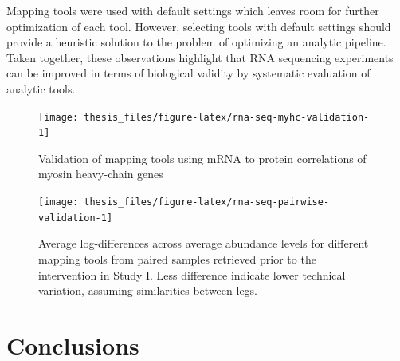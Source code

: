 \documentclass[twoside,10pt]{gihclass} %
\begin{document}
Mapping tools were used with default settings which leaves room for further optimization of each tool. However, selecting tools with default settings should provide a heuristic solution to the problem of optimizing an analytic pipeline. Taken together, these observations highlight that RNA sequencing experiments can be improved in terms of biological validity by systematic evaluation of analytic tools.
\begin{figure}

{\centering \texttt{[image: thesis\_files/figure-latex/rna-seq-myhc-validation-1]} 

}

\caption[Correlations between gene-family normalized protein and gene data from different mRNA quantification methods.]{Validation of mapping tools using mRNA to protein correlations of myosin heavy-chain genes}\label{fig:rna-seq-myhc-validation}
\end{figure}
\begin{figure}

{\centering \texttt{[image: thesis\_files/figure-latex/rna-seq-pairwise-validation-1]} 

}

\caption[Within-participant variation between RNA sequencing mapping tools.]{Average log-differences across average abundance levels for different mapping tools from paired samples retrieved prior to the intervention in Study I. Less difference indicate lower technical variation, assuming similarities between legs.}\label{fig:rna-seq-pairwise-validation}
\end{figure}
\hypertarget{conclusions}{%
\chapter{Conclusions}\label{conclusions}}
\end{document}

